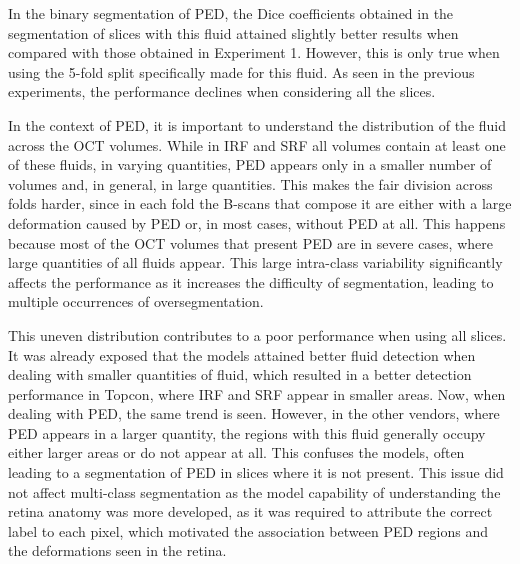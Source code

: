 In the binary segmentation of PED, the Dice coefficients obtained in the segmentation of slices with this fluid attained slightly better results when compared with those obtained in Experiment 1. However, this is only true when using the 5-fold split specifically made for this fluid. As seen in the previous experiments, the performance declines when considering all the slices.
\par
In the context of PED, it is important to understand the distribution of the fluid across the OCT volumes. While in IRF and SRF all volumes contain at least one of these fluids, in varying quantities, PED appears only in a smaller number of volumes and, in general, in large quantities. This makes the fair division across folds harder, since in each fold the B-scans that compose it are either with a large deformation caused by PED or, in most cases, without PED at all. This happens because most of the OCT volumes that present PED are in severe cases, where large quantities of all fluids appear. This large intra-class variability significantly affects the performance as it increases the difficulty of segmentation, leading to multiple occurrences of oversegmentation.
\par
This uneven distribution contributes to a poor performance when using all slices. It was already exposed that the models attained better fluid detection when dealing with smaller quantities of fluid, which resulted in a better detection performance in Topcon, where IRF and SRF appear in smaller areas. Now, when dealing with PED, the same trend is seen. However, in the other vendors, where PED appears in a larger quantity, the regions with this fluid generally occupy either larger areas or do not appear at all. This confuses the models, often leading to a segmentation of PED in slices where it is not present. This issue did not affect multi-class segmentation as the model capability of understanding the retina anatomy was more developed, as it was required to attribute the correct label to each pixel, which motivated the association between PED regions and the deformations seen in the retina.
\par
